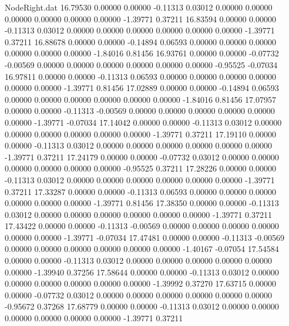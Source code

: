 \begin{filecontents}{NodeRight.dat}
  16.79530    0.00000    0.00000    -0.11313    0.03012    0.00000    0.00000    0.00000    0.00000    0.00000    0.00000   -1.39771    0.37211
  16.83594    0.00000    0.00000    -0.11313    0.03012    0.00000    0.00000    0.00000    0.00000    0.00000    0.00000   -1.39771    0.37211
  16.88678    0.00000    0.00000    -0.14894    0.06593    0.00000    0.00000    0.00000    0.00000    0.00000    0.00000   -1.84016    0.81456
  16.93761    0.00000    0.00000    -0.07732   -0.00569    0.00000    0.00000    0.00000    0.00000    0.00000    0.00000   -0.95525   -0.07034
  16.97811    0.00000    0.00000    -0.11313    0.06593    0.00000    0.00000    0.00000    0.00000    0.00000    0.00000   -1.39771    0.81456
  17.02889    0.00000    0.00000    -0.14894    0.06593    0.00000    0.00000    0.00000    0.00000    0.00000    0.00000   -1.84016    0.81456
  17.07957    0.00000    0.00000    -0.11313   -0.00569    0.00000    0.00000    0.00000    0.00000    0.00000    0.00000   -1.39771   -0.07034
  17.14042    0.00000    0.00000    -0.11313    0.03012    0.00000    0.00000    0.00000    0.00000    0.00000    0.00000   -1.39771    0.37211
  17.19110    0.00000    0.00000    -0.11313    0.03012    0.00000    0.00000    0.00000    0.00000    0.00000    0.00000   -1.39771    0.37211
  17.24179    0.00000    0.00000    -0.07732    0.03012    0.00000    0.00000    0.00000    0.00000    0.00000    0.00000   -0.95525    0.37211
  17.28226    0.00000    0.00000    -0.11313    0.03012    0.00000    0.00000    0.00000    0.00000    0.00000    0.00000   -1.39771    0.37211
  17.33287    0.00000    0.00000    -0.11313    0.06593    0.00000    0.00000    0.00000    0.00000    0.00000    0.00000   -1.39771    0.81456
  17.38350    0.00000    0.00000    -0.11313    0.03012    0.00000    0.00000    0.00000    0.00000    0.00000    0.00000   -1.39771    0.37211
  17.43422    0.00000    0.00000    -0.11313   -0.00569    0.00000    0.00000    0.00000    0.00000    0.00000    0.00000   -1.39771   -0.07034
  17.47481    0.00000    0.00000    -0.11313   -0.00569    0.00000    0.00000    0.00000    0.00000    0.00000    0.00000   -1.40167   -0.07054
  17.54584    0.00000    0.00000    -0.11313    0.03012    0.00000    0.00000    0.00000    0.00000    0.00000    0.00000   -1.39940    0.37256
  17.58644    0.00000    0.00000    -0.11313    0.03012    0.00000    0.00000    0.00000    0.00000    0.00000    0.00000   -1.39992    0.37270
  17.63715    0.00000    0.00000    -0.07732    0.03012    0.00000    0.00000    0.00000    0.00000    0.00000    0.00000   -0.95672    0.37268
  17.68779    0.00000    0.00000    -0.11313    0.03012    0.00000    0.00000    0.00000    0.00000    0.00000    0.00000   -1.39771    0.37211

\end{filecontents}
